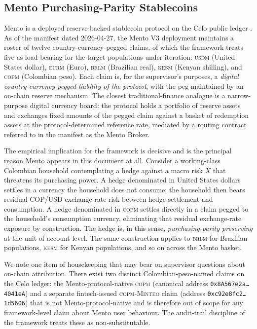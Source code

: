 \subsection{Mento Purchasing-Parity Stablecoins}\label{sec:4-mento}

Mento is a deployed reserve-backed stablecoin protocol on the Celo public
ledger \citep{mento_protocol_overview_2026,mento_v3_deployments_2026}. As of
the manifest dated 2026-04-27, the Mento V3 deployment maintains a roster of
twelve country-currency-pegged claims, of which the framework treats five as
load-bearing for the target populations under iteration: \textsc{usdm} (United
States dollar), \textsc{eurm} (Euro), \textsc{brlm} (Brazilian real),
\textsc{kesm} (Kenyan shilling), and \textsc{copm} (Colombian peso). Each
claim is, for the supervisor's purposes, a \emph{digital country-currency-pegged
liability of the protocol}, with the peg maintained by an on-chain reserve
mechanism. The closest traditional-finance analogue is a narrow-purpose
digital currency board: the protocol holds a portfolio of reserve assets and
exchanges fixed amounts of the pegged claim against a basket of redemption
assets at the protocol-determined reference rate, mediated by a routing
contract referred to in the manifest as the Mento Broker.

The empirical implication for the framework is decisive and is the principal
reason Mento appears in this document at all. Consider a working-class
Colombian household contemplating a hedge against a macro risk \(X\) that
threatens its purchasing power. A hedge denominated in United States dollars
settles in a currency the household does not consume; the household then bears
residual COP/USD exchange-rate risk between hedge settlement and consumption.
A hedge denominated in \textsc{copm} settles directly in a claim pegged to
the household's consumption currency, eliminating that residual exchange-rate
exposure by construction. The hedge is, in this sense,
\emph{purchasing-parity preserving} at the unit-of-account level. The same
construction applies to \textsc{brlm} for Brazilian populations,
\textsc{kesm} for Kenyan populations, and so on across the Mento basket.

We note one item of housekeeping that may bear on supervisor questions about
on-chain attribution. There exist two distinct Colombian-peso-named claims on
the Celo ledger: the Mento-protocol-native \textsc{copm} (canonical address
\texttt{0x8A567e2a\dots4041eA}) and a separate fintech-issued
\textsc{copm-Minteo} claim (address
\texttt{0xc92e8fc2\dots1d5606}) that is not Mento-protocol-native and is
therefore out of scope for any framework-level claim about Mento user
behaviour. The audit-trail discipline of the framework treats these as
non-substitutable.


